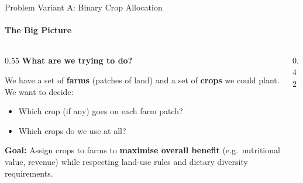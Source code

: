 \begin{frame}{Problem Variant A: Binary Crop Allocation}
    \framesubtitle{The Big Picture}

    \begin{columns}[T]
        \begin{column}{0.55\textwidth}
            \textbf{What are we trying to do?}
            \vspace{0.3cm}

            We have a set of \textbf{farms} (patches of land) and a set of
            \textbf{crops} we could plant. We want to decide:

            \vspace{0.3cm}
            \begin{itemize}
                \item Which crop (if any) goes on each farm patch?
                \item Which crops do we use at all?
            \end{itemize}

            \vspace{0.4cm}
            \textbf{Goal:} Assign crops to farms to \textbf{maximise overall benefit}
            (e.g.\ nutritional value, revenue) while respecting
            land-use rules and dietary diversity requirements.
        \end{column}
        \begin{column}{0.42\textwidth}
        \end{column}
    \end{columns}
\end{frame}

